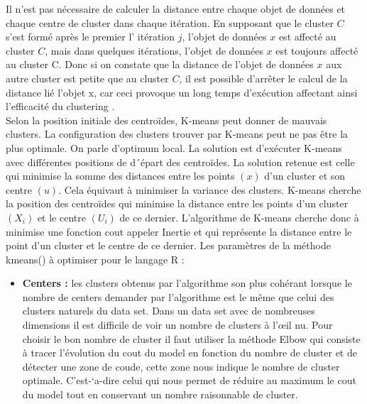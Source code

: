 Il n’est pas nécessaire de calculer la distance entre chaque objet de données et chaque centre de cluster dans chaque itération. En supposant que le cluster \(\displaystyle C \) s'est formé après le premier l' itération \(\displaystyle j \), l'objet de données \(\displaystyle x \) est affecté au cluster \(\displaystyle C \), mais dans quelques itérations, l'objet de données \(\displaystyle x \) est toujours affecté au cluster C. Donc si on constate que la distance de l'objet de données \(\displaystyle x \) aux autre cluster est petite que au cluster \(\displaystyle C \), il est possible d’arrêter le calcul de la distance lié l’objet x, car ceci provoque un long temps d'exécution affectant ainsi l'efficacité du clustering \cite{na2010research}. \\

Selon la position initiale des centroïdes, K-means peut donner de mauvais clusters. La configuration des clusters trouver par K-means peut ne pas être la plus optimale. On parle d’optimum local. La solution est d’exécuter K-means avec différentes positions de d´épart des centroïdes. La solution retenue est celle qui minimise la somme des distances entre les points \(\displaystyle (x) \) d’un cluster et son centre \(\displaystyle (u) \). Cela équivaut à minimiser la variance des clusters. K-means cherche la position des centroïdes qui minimise la distance entre les points
d’un cluster \(\displaystyle (X_{i}) \) et le centre \(\displaystyle (U_{i}) \) de ce dernier. L'algorithme de K-means cherche donc à minimise une fonction cout appeler Inertie et qui représente la distance entre le point d’un cluster et le centre de ce dernier. Les paramètres de la méthode kmeans() à optimiser pour le langage R :

\begin{itemize}
	\item  \textbf{Centers :} les clusters obtenus par l’algorithme son plus cohérant lorsque le nombre de centers demander par l’algorithme est le même que celui des clusters naturels du data set. Dans un data set avec de nombreuses dimensions il est difficile de voir un nombre de clusters à l’œil nu. Pour choisir le bon nombre de cluster il faut utiliser la méthode Elbow qui consiste à tracer l’évolution du cout du model en fonction du nombre de cluster et de détecter une zone de coude, cette zone nous indique le nombre de cluster optimale. C’est-`a-dire celui qui nous permet de réduire au maximum le cout du model tout en conservant un nombre raisonnable de cluster.
\end{itemize}

